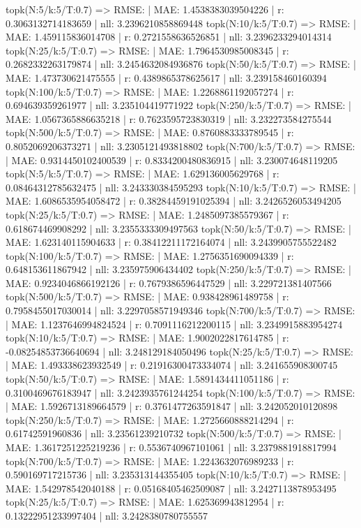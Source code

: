 topk(N:5/k:5/T:0.7) => RMSE: | MAE: 1.4538383039504226 | r: 0.3063132714183659 | nll: 3.2396210858869448
topk(N:10/k:5/T:0.7) => RMSE: | MAE: 1.459115836014708 | r: 0.2721558636526851 | nll: 3.2396233294014314
topk(N:25/k:5/T:0.7) => RMSE: | MAE: 1.7964530985008345 | r: 0.2682332263179874 | nll: 3.2454632084936876
topk(N:50/k:5/T:0.7) => RMSE: | MAE: 1.473730621475555 | r: 0.4389865378625617 | nll: 3.239158460160394
topk(N:100/k:5/T:0.7) => RMSE: | MAE: 1.2268861192057274 | r: 0.694639359261977 | nll: 3.235104419771922
topk(N:250/k:5/T:0.7) => RMSE: | MAE: 1.0567365886635218 | r: 0.7623595723830319 | nll: 3.232273584275544
topk(N:500/k:5/T:0.7) => RMSE: | MAE: 0.8760883333789545 | r: 0.8052069206373271 | nll: 3.2305121493818802
topk(N:700/k:5/T:0.7) => RMSE: | MAE: 0.9314450102400539 | r: 0.8334200480836915 | nll: 3.230074648119205
topk(N:5/k:5/T:0.7) => RMSE: | MAE: 1.629136005629768 | r: 0.08464312785632475 | nll: 3.243330384595293
topk(N:10/k:5/T:0.7) => RMSE: | MAE: 1.6086535954058472 | r: 0.38284459191025394 | nll: 3.2426526053494205
topk(N:25/k:5/T:0.7) => RMSE: | MAE: 1.2485097385579367 | r: 0.618674469908292 | nll: 3.2355333309497563
topk(N:50/k:5/T:0.7) => RMSE: | MAE: 1.623140115904633 | r: 0.38412211172164074 | nll: 3.2439905755522482
topk(N:100/k:5/T:0.7) => RMSE: | MAE: 1.2756351690094339 | r: 0.648153611867942 | nll: 3.235975906434402
topk(N:250/k:5/T:0.7) => RMSE: | MAE: 0.9234046866192126 | r: 0.7679386596447529 | nll: 3.229721381407566
topk(N:500/k:5/T:0.7) => RMSE: | MAE: 0.938428961489758 | r: 0.7958455017030014 | nll: 3.2297058571949346
topk(N:700/k:5/T:0.7) => RMSE: | MAE: 1.1237646994824524 | r: 0.7091116212200115 | nll: 3.2349915883954274
topk(N:10/k:5/T:0.7) => RMSE: | MAE: 1.9002022817614785 | r: -0.08254853736640694 | nll: 3.248129184050496
topk(N:25/k:5/T:0.7) => RMSE: | MAE: 1.493338623932549 | r: 0.21916300473334074 | nll: 3.241655908300745
topk(N:50/k:5/T:0.7) => RMSE: | MAE: 1.5891434411051186 | r: 0.3100469676183947 | nll: 3.2423935761244254
topk(N:100/k:5/T:0.7) => RMSE: | MAE: 1.5926713189664579 | r: 0.3761477263591847 | nll: 3.242052010120898
topk(N:250/k:5/T:0.7) => RMSE: | MAE: 1.2725660888214294 | r: 0.61742591960836 | nll: 3.23561239210732
topk(N:500/k:5/T:0.7) => RMSE: | MAE: 1.3617251225219236 | r: 0.5536740967101061 | nll: 3.2379881918817994
topk(N:700/k:5/T:0.7) => RMSE: | MAE: 1.2243632076989233 | r: 0.590169717215736 | nll: 3.235313144355405
topk(N:10/k:5/T:0.7) => RMSE: | MAE: 1.542978542040188 | r: 0.05168405462509087 | nll: 3.2427113878953495
topk(N:25/k:5/T:0.7) => RMSE: | MAE: 1.625369943812954 | r: 0.13222951233997404 | nll: 3.2428380780755557
